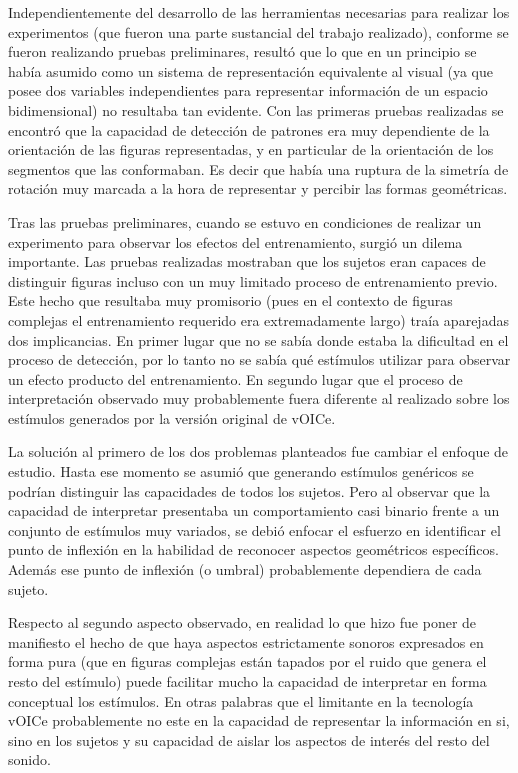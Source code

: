 \documentclass{article}
\numberwithin{figure}{section}
\begin{document}
    Independientemente del desarrollo de las herramientas necesarias para realizar los experimentos (que fueron una parte sustancial del trabajo realizado), conforme se fueron realizando pruebas preliminares, resultó que lo que en un principio se había asumido como un sistema de representación equivalente al visual (ya que posee dos variables independientes para representar información de un espacio bidimensional) no resultaba tan evidente. Con las primeras pruebas realizadas se encontró que la capacidad de detección de patrones era muy dependiente de la orientación de las figuras representadas, y en particular de la orientación de los segmentos que las conformaban. Es decir que había una ruptura de la simetría de rotación muy marcada a la hora de representar y percibir las formas geométricas.
    
    Tras las pruebas preliminares, cuando se estuvo en condiciones de realizar un experimento para observar los efectos del entrenamiento, surgió un dilema importante. Las pruebas realizadas mostraban que los sujetos eran capaces de distinguir figuras incluso con un muy limitado proceso de entrenamiento previo. Este hecho que resultaba muy promisorio (pues en el contexto de figuras complejas el entrenamiento requerido era extremadamente largo) traía aparejadas dos implicancias. En primer lugar que no se sabía donde estaba la dificultad en el proceso de detección, por lo tanto no se  sabía qué estímulos utilizar para observar un efecto producto del entrenamiento. En segundo lugar que el proceso de interpretación observado muy probablemente fuera diferente al realizado sobre los estímulos generados por la versión original de vOICe. 
    
    La solución al primero de los dos problemas planteados fue cambiar el enfoque de estudio. Hasta ese momento se asumió que generando estímulos genéricos se podrían distinguir las capacidades de todos los sujetos. Pero al observar que la capacidad de interpretar presentaba un comportamiento casi binario frente a un conjunto de estímulos muy variados, se debió enfocar el esfuerzo en identificar el punto de inflexión en la habilidad de reconocer aspectos geométricos específicos. Además ese punto de inflexión (o umbral) probablemente dependiera de cada sujeto. 
    
    Respecto al segundo aspecto observado, en realidad lo que hizo fue poner de manifiesto el hecho de que haya aspectos estrictamente sonoros expresados en forma pura (que en figuras complejas están tapados por el ruido que genera el resto del estímulo) puede facilitar mucho la capacidad de interpretar en forma conceptual los estímulos. En otras palabras que el limitante en la tecnología vOICe probablemente no este en la capacidad de representar la información en si, sino en los sujetos y su capacidad de aislar los aspectos de interés del resto del sonido.
    
\end{document}
